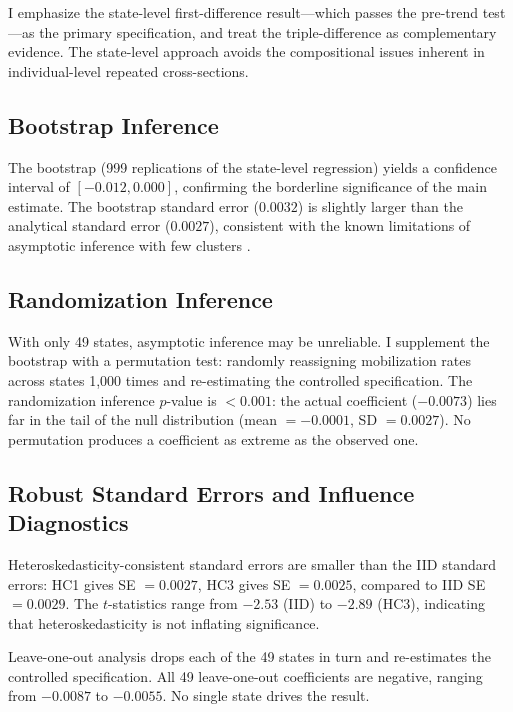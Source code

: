 \documentclass[12pt]{article}
\begin{document}
I emphasize the state-level first-difference result---which passes the pre-trend test---as the primary specification, and treat the triple-difference as complementary evidence. The state-level approach avoids the compositional issues inherent in individual-level repeated cross-sections.

\subsection{Bootstrap Inference}

The bootstrap (999 replications of the state-level regression) yields a confidence interval of $[-0.012, 0.000]$, confirming the borderline significance of the main estimate. The bootstrap standard error ($0.0032$) is slightly larger than the analytical standard error ($0.0027$), consistent with the known limitations of asymptotic inference with few clusters \citep{cameron2008bootstrap, conley2011inference}.

\subsection{Randomization Inference}

With only 49 states, asymptotic inference may be unreliable. I supplement the bootstrap with a permutation test: randomly reassigning mobilization rates across states 1,000 times and re-estimating the controlled specification. The randomization inference $p$-value is $<0.001$: the actual coefficient ($-0.0073$) lies far in the tail of the null distribution (mean $= -0.0001$, SD $= 0.0027$). No permutation produces a coefficient as extreme as the observed one.

\subsection{Robust Standard Errors and Influence Diagnostics}

Heteroskedasticity-consistent standard errors are smaller than the IID standard errors: HC1 gives SE $= 0.0027$, HC3 gives SE $= 0.0025$, compared to IID SE $= 0.0029$. The $t$-statistics range from $-2.53$ (IID) to $-2.89$ (HC3), indicating that heteroskedasticity is not inflating significance.

Leave-one-out analysis drops each of the 49 states in turn and re-estimates the controlled specification. All 49 leave-one-out coefficients are negative, ranging from $-0.0087$ to $-0.0055$. No single state drives the result.
\end{document}
